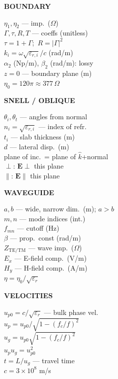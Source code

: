 \documentclass[6pt,letterpaper]{article}
\newcommand{\shead}[3]{%
  \noindent\colorbox{#1}{\parbox{\dimexpr\linewidth-2\fboxsep\relax}%
  {\color{#2}\bfseries\fontsize{6}{7}\selectfont #3}}\vspace{0.3pt}}
\begin{document}
\vfill
\vspace{1pt}
\noindent
\begin{minipage}[t]{0.19\linewidth}
\shead{purplebg}{purple}{BOUNDARY}
\begin{ebox}
$\eta_1,\eta_2$ --- imp.\ ($\Omega$)\\
$\Gamma,\tau,R,T$ --- coeffs (unitless)\\
$\tau\!=\!1\!+\!\Gamma$;\ $R\!=\!|\Gamma|^2$\\
$k_i\!=\!\omega\sqrt{\varepsilon_{r,i}}/c$ (rad/m)\\
$\alpha_2$ (Np/m), $\beta_2$ (rad/m): lossy\\
$z\!=\!0$ --- boundary plane (m)\\
$\eta_0\!=\!120\pi\!\approx\!377\,\Omega$
\end{ebox}
\end{minipage}\hfill
\begin{minipage}[t]{0.19\linewidth}
\shead{tealbg}{teal}{SNELL / OBLIQUE}
\begin{ebox}
$\theta_i,\theta_t$ --- angles from normal\\
$n_i=\sqrt{\varepsilon_{r,i}}$ --- index of refr.\\
$t_i$ --- slab thickness (m)\\
$d$ --- lateral disp.\ (m)\\
plane of inc.\ = plane of $\hat{k}$+normal\\
$\perp$: $\mathbf{E}\perp$ this plane\\
$\parallel$: $\mathbf{E}\parallel$ this plane
\end{ebox}
\end{minipage}\hfill
\begin{minipage}[t]{0.19\linewidth}
\shead{coralbg}{coral}{WAVEGUIDE}
\begin{ebox}
$a,b$ --- wide, narrow dim.\ (m); $a>b$\\
$m,n$ --- mode indices (int.)\\
$f_{mn}$ --- cutoff (Hz)\\
$\beta$ --- prop.\ const (rad/m)\\
$Z_{\text{TE/TM}}$ --- wave imp.\ ($\Omega$)\\
$E_x$ --- E-field comp.\ (V/m)\\
$H_y$ --- H-field comp.\ (A/m)\\
$\eta=\eta_0/\sqrt{\varepsilon_r}$
\end{ebox}
\end{minipage}\hfill
\begin{minipage}[t]{0.19\linewidth}
\shead{amberbg}{amber}{VELOCITIES}
\begin{ebox}
$u_{p0}=c/\sqrt{\varepsilon_r}$ --- bulk phase vel.\\
$u_p=u_{p0}/\sqrt{1-(f_c/f)^2}$\\
$u_g=u_{p0}\sqrt{1-(f_c/f)^2}$\\
$u_p u_g = u_{p0}^2$\\
$t=L/u_g$ --- travel time\\
$c=3\times10^8$ m/s
\end{ebox}
\end{minipage}\hfill
\end{document}
